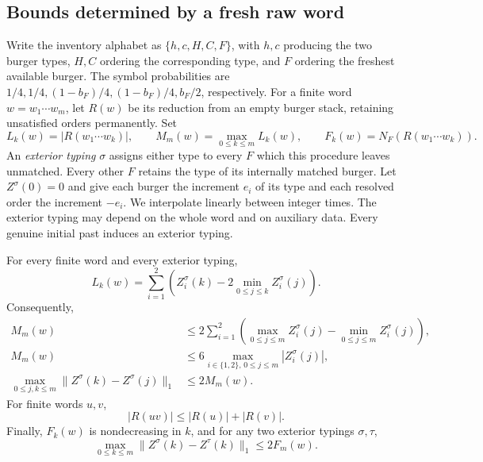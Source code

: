 \subsection{Bounds determined by a fresh raw word}
\label{arm:raw-word-bounds}

Write the inventory alphabet as $\{h,c,H,C,F\}$, with $h,c$
producing the two burger types, $H,C$ ordering the corresponding type,
and $F$ ordering the freshest available burger.  The symbol probabilities
are $1/4,1/4,(1-b_F)/4,(1-b_F)/4,b_F/2$, respectively.
For a finite word $w=w_1\cdots w_m$, let $R(w)$ be its reduction
from an empty burger stack, retaining unsatisfied orders permanently.
Set
\[
 L_k(w)=|R(w_1\cdots w_k)|,\qquad
 M_m(w)=\max_{0\le k\le m}L_k(w),\qquad
 F_k(w)=N_F(R(w_1\cdots w_k)).
\]
An \emph{exterior typing} $\sigma$ assigns either type to every $F$
which this procedure leaves unmatched.  Every other $F$ retains the type
of its internally matched burger.  Let $Z^\sigma(0)=0$ and give each
burger the increment $e_i$ of its type and each resolved order the
increment $-e_i$.  We interpolate linearly between integer times.
The exterior typing may depend on the whole word and on auxiliary data.
Every genuine initial past induces an exterior typing.

\begin{lemma}
\label{arm:raw-identities}
For every finite word and every exterior typing,
\begin{equation}
\label{arm:raw-length-identity}
 L_k(w)=\sum_{i=1}^2\left(Z_i^\sigma(k)
             -2\min_{0\le j\le k}Z_i^\sigma(j)\right).
\end{equation}
Consequently,
\begin{align}
 M_m(w)&\le 2\sum_{i=1}^2
       \left(\max_{0\le j\le m}Z_i^\sigma(j)
                    -\min_{0\le j\le m}Z_i^\sigma(j)\right),
       \label{arm:raw-contour-oscillation}\\
 M_m(w)&\le 6\max_{i\in\{1,2\},\,0\le j\le m}|Z_i^\sigma(j)|,
       \label{arm:raw-contour-tightness}\\
 \max_{0\le j,k\le m}\|Z^\sigma(k)-Z^\sigma(j)\|_1&\le 2M_m(w).
       \label{arm:raw-universal-domination}
\end{align}
For finite words $u,v$,
\begin{equation}
\label{arm:raw-subadditivity}
 |R(uv)|\le |R(u)|+|R(v)|.
\end{equation}
Finally, $F_k(w)$ is nondecreasing in $k$, and for any two exterior
typings $\sigma,\tau$,
\begin{equation}
\label{arm:raw-typing-error}
 \max_{0\le k\le m}\|Z^\sigma(k)-Z^\tau(k)\|_1\le 2F_m(w).
\end{equation}
\end{lemma}

